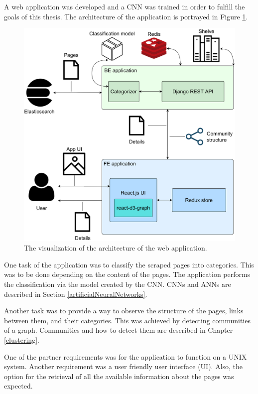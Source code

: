 \label{developmentIntroduction}
A web application was developed and a CNN was trained in order to fulfill the goals of this thesis. The architecture of the application is portrayed in Figure \ref{ApplicationArchitecture}. 

\begin{figure}[ht!]
  \centering
  \includegraphics[width = \textwidth]{Images/ApplicationArchitecture.png}
  \caption{The visualization of the architecture of the web application.}
  \label{ApplicationArchitecture}
\end{figure}

One task of the application was to classify the scraped pages into categories. This was to be done depending on the content of the pages. The application performs the classification via the model created by the CNN. CNNs and ANNs are described in Section \ref{artificialNeuralNetworks}. 

Another task was to provide a way to observe the structure of the pages, links between them, and their categories. This was achieved by detecting communities of a graph. Communities and how to detect them are described in Chapter \ref{clustering}. 

One of the partner requirements was for the application to function on a UNIX system. Another requirement was a user friendly user interface (UI). Also, the option for the retrieval of all the available information about the pages was expected. 

